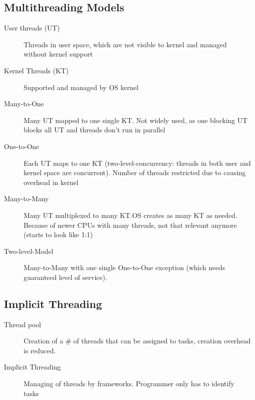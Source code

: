 \subsection*{Multithreading Models}
\begin{description}
  \item[User threads (UT)] Threads in user space, which are not visible to kernel and managed without kernel support
  \item[Kernel Threads (KT)] Supported and managed by OS kernel
  \item[Many-to-One] Many UT mapped to one single KT. Not widely used, as one blocking UT blocks all UT and threads don't run in parallel
  \item[One-to-One] Each UT maps to one KT (two-level-concurrency: threads in both user and kernel space are concurrent). Number of threads restricted due to causing overhead in kernel
  \item[Many-to-Many] Many UT multiplexed to many KT.OS creates as many KT as needed. Because of newer CPUs with many threads, not that relevant anymore (starts to look like 1:1)
  \item[Two-level-Model] Many-to-Many with one single One-to-One exception (which needs guaranteed level of service).
\end{description}

\subsection*{Implicit Threading}
\begin{description}
  \item[Thread pool] Creation of a # of threads that can be assigned to tasks, creation overhead is reduced.
  \item[Implicit Threading] Managing of threads by frameworks. Programmer only has to identify tasks
\end{description}

